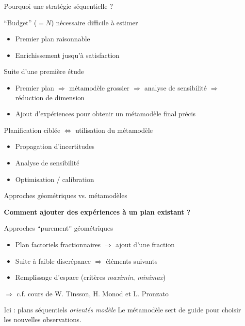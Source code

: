 \begin{frame}{Pourquoi une stratégie séquentielle ?}
\begin{block}{``Budget'' ($=N$) nécessaire difficile à estimer}
\begin{itemize}
  \item Premier plan raisonnable
  \item Enrichissement jusqu'à satisfaction
\end{itemize}
\end{block}

\begin{alertblock}{Suite d'une première étude}
\begin{itemize}
\item Premier plan $\Rightarrow$ métamodèle grossier $\Rightarrow$ analyse de sensibilité $\Rightarrow$ réduction de dimension
\item Ajout d'expériences pour obtenir un métamodèle final précis
\end{itemize}
\end{alertblock}

\begin{exampleblock}{Planification ciblée $\Leftrightarrow$ utilisation du métamodèle}
\begin{itemize}
\item Propagation d'incertitudes
\item Analyse de sensibilité
\item Optimisation / calibration
\end{itemize}
\end{exampleblock}
\end{frame}
\begin{frame}{Approches géométriques vs. métamodèles}

\textbf{Comment ajouter des expériences à un plan existant ?}

\vspace{5mm}

\begin{block}{Approches ``purement'' géométriques}
  \begin{itemize}
  \item Plan factoriels fractionnaires $\Rightarrow$ ajout d'une fraction
  \item Suite à faible discrépance $\Rightarrow$ éléments suivants
  \item Remplissage d'espace (critères \textit{maximin}, \textit{minimax})
 \end{itemize}
$\Rightarrow$ c.f. cours de W. Tinsson, H. Monod et L. Pronzato
\end{block}

\begin{alertblock}{Ici : plans séquentiels \emph{\textit{orientés modèle}}}
 Le métamodèle sert de guide pour choisir les nouvelles observations.
\end{alertblock}
\end{frame}
